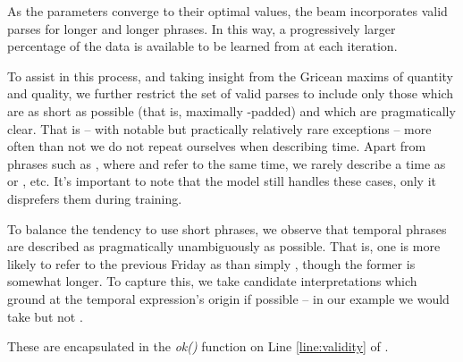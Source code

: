 As the parameters converge to their optimal values, the beam incorporates
	valid parses for longer and longer phrases.
In this way, a progressively larger percentage of the data is available to be
	learned from at each iteration.

To assist in this process, and taking insight from the Gricean 
	maxims of quantity and quality, we further restrict the set of valid 
	parses to include only those which are as short as possible
	(that is, maximally -padded) and which are pragmatically clear.
That is -- with notable but practically relatively rare exceptions --
	more often than not we do not repeat ourselves when describing time.
Apart from phrases such as , where 
	and  refer to the same time, we rarely describe a time as
	 or , etc.
It's important to note that the model still handles these cases, only it
	disprefers them during training.

To balance the tendency to use short phrases, we observe that
	temporal phrases are described as pragmatically unambiguously as possible.
That is, one is more likely to refer to the previous Friday as 
	than simply , though the former is somewhat longer.
To capture this, we take candidate interpretations which ground at the
	temporal expression's origin if possible --
	in our example we would take  but not .

These are encapsulated in the \textit{ok()} function
	on Line \ref{line:validity} of .

